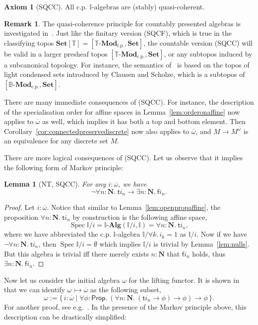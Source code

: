 \documentclass[12pt]{amsart}
\newtheorem{lemma}[theorem]{Lemma}
\theoremstyle{definition}
\newtheorem{remark}[theorem]{Remark}
\newtheorem*{axiom}{Axiom}
\newcommand{\mb}[1]{\mathbf{#1}}
\newcommand{\mbb}[1]{\mathbb{#1}}
\newcommand{\T}{\mbb T}
\newcommand{\I}{\mbb I}
\newcommand{\mr}[1]{\mathrm{#1}}
\newcommand{\ms}[1]{\mathsf{#1}}
\newcommand{\Set}{\mb{Set}}
\newcommand{\alg}{\text{-}\mb{Alg}}
\newcommand{\ov}[1]{\overline{#1}}
\newcommand{\scomp}[2]{\{\,#1\mid#2\,\}}
\newcommand{\inj}{\rightarrowtail}
\newcommand{\fp}{_{\mr{f.p.}}}
\newcommand{\cp}{_{\mr{c.p.}}}
\newcommand{\N}{\mb N}
\newcommand{\fa}[2]{\forall #1\!\colon\!\!#2.\ }
\newcommand{\ex}[2]{\exists #1\!\colon\!\!#2.\ }
\newcommand{\emp}{\emptyset}
\newcommand{\pp}{\ms{Prop}}
\newcommand{\mmod}[1]{#1\text{-}\mathbf{Mod}}
\newcommand{\spec}{\operatorname{Spec}}
\begin{document}
\begin{axiom}[SQCC]
  All c.p. $\I$-algebras are (stably) quasi-coherent.
\end{axiom}

\begin{remark}
  The quasi-coherence principle for countably presented algebras is investigated in~\cite{cherubini2024foundation}. Just like the finitary version (SQCF), which is true in the classifying topos $\Set[\T] = [\mmod\T\fp,\Set]$, the countable version (SQCC) will be valid in a larger presheaf topos $[\mmod\T\cp,\Set]$, or any subtopos induced by a subcanonical topology. For instance, the semantics of~\cite{cherubini2024foundation} is based on the topos of light condensed sets introduced by Clausen and Scholze, which is a subtopos of $[\mmod{\mbb B}\cp,\Set]$.
\end{remark}

There are many immediate consequences of (SQCC). For instance, the description of the specialisation order for affine spaces in Lemma~\ref{lem:orderonaffine} now applies to $\ov\omega$ as well, which implies it has both a top and bottom element. Then Corollary~\ref{cor:connectedpreservediscrete} now also applies to $\ov\omega$, and $M \to M^{\ov\omega}$ is an equivalence for any discrete set $M$. 

There are more logical consequences of (SQCC). Let us observe that it implies the following form of Markov principle:

\begin{lemma}[NT, SQCC]\label{lem:markov}
  For any $i : \ov\omega$, we have
  \[ \neg\fa{n}{\N}\ms ti_n \to \ex n\N\ms fi_n. \]
\end{lemma}
\begin{proof}
  Let $i : \ov\omega$. Notice that similar to Lemma~\ref{lem:openpropaffine}, the proposition $\fa n\N \ms ti_n$ by construction is the following affine space, 
  \[ \spec\I/i = \I\alg(\I/i,\I) = \fa n\N \ms ti_n, \]
  where we have abbreviated the c.p. $\I$-algebra $\I/\forall k.\, i_k = 1$ as $\I/i$. Now if we have $\neg\fa n\N \ms ti_n$, then $\spec\I/i = \emp$ which implies $\I/i$ is trivial by Lemma~\ref{lem:nulls}. But this algebra is trivial iff there merely exists $n : \N$ that $\ms fi_n$ holds, thus $\ex n\N \ms fi_n$.
\end{proof}

Now let us consider the initial algebra $\omega$ for the lifting functor. It is shown in~\cite{JIBLADZE1997185} that we can identify $\omega \inj \ov\omega$ as the following subset,
\[ \omega := \scomp{i : \ov\omega}{\fa\phi{\pp} (\fa n{\N} (\ms ti_n \to \phi) \to \phi) \to \phi}. \]
For another proof, see e.g.~\cite{VANOOSTEN2000233}. In the presence of the Markov principle above, this description can be drastically simplified:
\end{document}
